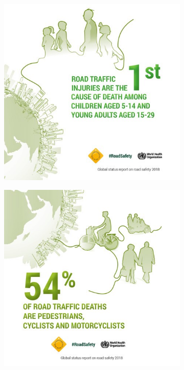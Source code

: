 \begin{figure}[H]
\begin{subfigure}[c]{0.3\textwidth}
		\includegraphics[width=\textwidth]{img/road_safety/1st-cause.jpg}
		\label{fig:test_image_2}
	\end{subfigure}
	\quad
	\begin{subfigure}[c]{0.3\textwidth}
		\includegraphics[width=\textwidth]{img/road_safety/54-percent-deaths.jpg}

\end{subfigure}
\end{figure}
